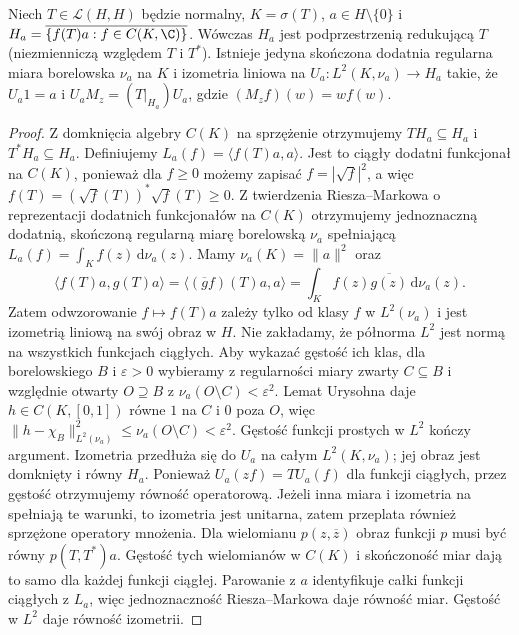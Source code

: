 \begin{lemat}
\label{lem:cyclic-model32}
Niech $T\in\mathcal L(H,H)$ będzie normalny, $K=\sigma(T)$,
$a\in H\setminus\{0\}$ i
$H_a=\overline{\{f(T)a:f\in C(K,\C)\}}$.
Wówczas $H_a$ jest podprzestrzenią redukującą $T$
(niezmienniczą względem $T$ i $T^*$).
Istnieje jedyna skończona dodatnia regularna miara borelowska
$\nu_a$ na $K$ i izometria liniowa na
$U_a:L^2(K,\nu_a)\to H_a$ takie, że
$U_a1=a$ i $U_aM_z=(T|_{H_a})U_a$, gdzie
$(M_zf)(w)=wf(w)$.
\end{lemat}
\begin{proof}
Z domknięcia algebry $C(K)$ na sprzężenie otrzymujemy
$T H_a\subseteq H_a$ i $T^*H_a\subseteq H_a$.
Definiujemy $L_a(f)=\langle f(T)a,a\rangle$. Jest to ciągły
dodatni funkcjonał na $C(K)$, ponieważ dla $f\geq0$
możemy zapisać $f=|\sqrt f|^2$, a więc
$f(T)=(\sqrt f(T))^*\sqrt f(T)\geq0$.
Z twierdzenia Riesza--Markowa o reprezentacji dodatnich
funkcjonałów na $C(K)$ otrzymujemy jednoznaczną dodatnią,
skończoną regularną miarę borelowską $\nu_a$ spełniającą
$L_a(f)=\int_K f(z)\,\mathrm d\nu_a(z)$.
Mamy $\nu_a(K)=\|a\|^2$ oraz
\[
 \langle f(T)a,g(T)a\rangle
 =\langle (\overline g f)(T)a,a\rangle
 =\int_K f(z)\overline{g(z)}\,\mathrm d\nu_a(z).
\]
Zatem odwzorowanie $f\mapsto f(T)a$ zależy tylko od
klasy $f$ w $L^2(\nu_a)$ i jest izometrią liniową na
swój obraz w $H$. Nie zakładamy, że półnorma $L^2$
jest normą na wszystkich funkcjach ciągłych.
Aby wykazać gęstość ich klas, dla borelowskiego $B$
i $\varepsilon>0$ wybieramy z regularności miary
zwarty $C\subseteq B$ i względnie otwarty $O\supseteq B$
z $\nu_a(O\setminus C)<\varepsilon^2$.
Lemat Urysohna daje $h\in C(K,[0,1])$ równe $1$ na $C$
i $0$ poza $O$, więc
$\|h-\chi_B\|_{L^2(\nu_a)}^2\le\nu_a(O\setminus C)<\varepsilon^2$.
Gęstość funkcji prostych w $L^2$ kończy argument. Izometria przedłuża się do $U_a$ na całym
$L^2(K,\nu_a)$; jej obraz jest domknięty i równy $H_a$.
Ponieważ $U_a(zf)=T U_a(f)$ dla funkcji ciągłych,
przez gęstość otrzymujemy równość operatorową.
Jeżeli inna miara i izometria na spełniają te warunki,
to izometria jest unitarna, zatem przeplata również
sprzężone operatory mnożenia. Dla wielomianu
$p(z,\overline z)$ obraz funkcji $p$ musi być równy
$p(T,T^*)a$. Gęstość tych wielomianów w $C(K)$
i skończoność miar dają to samo dla każdej funkcji ciągłej.
Parowanie z $a$ identyfikuje całki funkcji ciągłych
z $L_a$, więc jednoznaczność Riesza--Markowa daje
równość miar. Gęstość w $L^2$ daje równość izometrii.
\end{proof}

